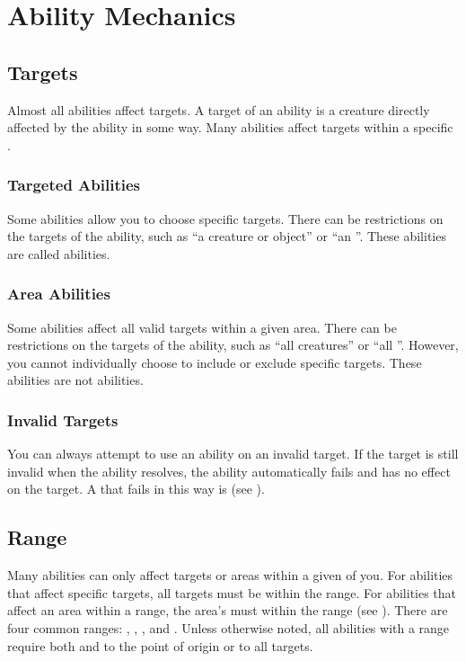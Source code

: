 \section{Ability Mechanics}\label{Ability Mechanics}

    \subsection{Targets}\label{Targets}
        Almost all abilities affect targets.
        A target of an ability is a creature directly affected by the ability in some way.
        Many abilities affect targets within a specific .

        \subsubsection{Targeted Abilities}\label{Targeted Abilities}
            Some abilities allow you to choose specific targets.
            There can be restrictions on the targets of the ability, such as ``a creature or object'' or ``an ''.
            These abilities are called  abilities.

        \subsubsection{Area Abilities}
            Some abilities affect all valid targets within a given area.
            There can be restrictions on the targets of the ability, such as ``all creatures'' or ``all ''.
            However, you cannot individually choose to include or exclude specific targets.
            These abilities are not  abilities.

        \subsubsection{Invalid Targets}
            You can always attempt to use an ability on an invalid target.
            If the target is still invalid when the ability resolves, the ability automatically fails and has no effect on the target.
            A  that fails in this way is  (see ).

    \subsection{Range}\label{Range}
        Many abilities can only affect targets or areas within a given  of you.
        For abilities that affect specific targets, all targets must be within the range.
        For abilities that affect an area within a range, the area's  must within the range (see ).
        There are four common ranges: \rngclose, \rngmed, \rnglong, and \rngext.
        Unless otherwise noted, all abilities with a range require both  and  to the point of origin or to all targets.


